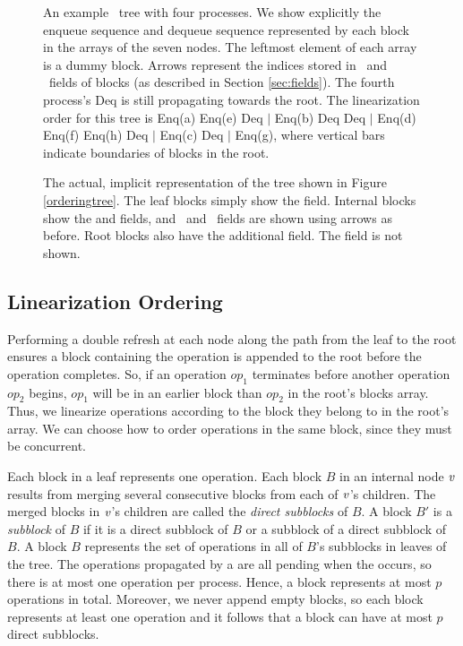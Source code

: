 \begin{figure*}[t]

\caption{An example \ordering\ tree with four processes. 
We show explicitly the enqueue sequence and dequeue sequence represented by each block in the  arrays of the seven nodes.  The leftmost element of each  array is a dummy block.
Arrows represent the indices stored in \eleft\ and \eright\ fields of blocks (as described in Section \ref{sec:fields}).
The fourth process's Deq is still propagating towards the root.
The linearization order for this tree is
Enq(a) Enq(e) Deq $\mid$ Enq(b) Deq Deq $\mid$ Enq(d) Enq(f) Enq(h) Deq $\mid$ Enq(c) Deq $\mid$ Enq(g), where vertical bars indicate boundaries of blocks in the root.\label{orderingtree}}
\medskip

\caption{\label{implicit}The actual, implicit representation of the tree shown in Figure \ref{orderingtree}.
The leaf blocks simply show the  field.
Internal blocks show the  and  fields,
and \eleft\ and \eright\ fields are shown using arrows as before.
Root blocks also have the additional  field.
The  field is not shown.}
\end{figure*}

\subsection{Linearization Ordering}

Performing a double refresh at each node along the path from the leaf to the root ensures 
a block containing the operation is appended to the root before the operation completes.
So, if an operation $op_1$ terminates before another operation $op_2$ begins, 
$op_1$ will be in an earlier block than $op_2$ in the root's blocks array.
Thus, we linearize operations according to the block they belong to in the root's array.
We can choose how to order operations in the same block, since they must be concurrent.

Each block in a leaf represents one operation.
Each block $B$ in an internal node $\mbox{\textnormal{\textit{v}}}$ results from merging
several consecutive blocks from each of $\mbox{\textnormal{\textit{v}}}$'s children.
The merged blocks in $\mbox{\textnormal{\textit{v}}}$'s children are called the \emph{direct subblocks} of $B$.
A block $B'$ is a \emph{subblock} of $B$ if it is a direct subblock of $B$
or a subblock of a direct subblock of $B$.
A block $B$ represents the set of operations in all of $B$'s subblocks in leaves of the tree.
The operations propagated by a  are all pending when the  occurs,
so there is at most one operation per process.
Hence, a block represents at most $p$ operations in total.  
Moreover, we never append empty blocks, so 
each block represents at least one operation and it follows that a block can have at most $p$ direct subblocks.

